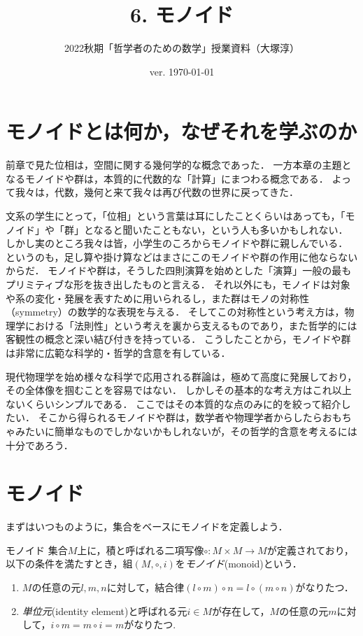 \documentclass[11pt,a4paper, dvipdfmx]{jsarticle}
\begin{document}
\title{6. モノイド}
\author{2022秋期「哲学者のための数学」授業資料（大塚淳）}
\date{ver. \today}
\maketitle

\section{モノイドとは何か，なぜそれを学ぶのか}
前章で見た位相は，空間に関する幾何学的な概念であった．
一方本章の主題となるモノイドや群は，本質的に代数的な「計算」にまつわる概念である．
よって我々は，代数，幾何と来て我々は再び代数の世界に戻ってきた．

文系の学生にとって，「位相」という言葉は耳にしたことくらいはあっても，「モノイド」や「群」となると聞いたこともない，という人も多いかもしれない．
しかし実のところ我々は皆，小学生のころからモノイドや群に親しんでいる．
というのも，足し算や掛け算などはまさにこのモノイドや群の作用に他ならないからだ．
モノイドや群は，そうした四則演算を始めとした「演算」一般の最もプリミティブな形を抜き出したものと言える．
それ以外にも，モノイドは対象や系の変化・発展を表すために用いられるし，また群はモノの対称性（symmetry）の数学的な表現を与える．
そしてこの対称性という考え方は，物理学における「法則性」という考えを裏から支えるものであり，また哲学的には客観性の概念と深い結び付きを持っている．
こうしたことから，モノイドや群は非常に広範な科学的・哲学的含意を有している．

現代物理学を始め様々な科学で応用される群論は，極めて高度に発展しており，その全体像を掴むことを容易ではない．
しかしその基本的な考え方はこれ以上ないくらいシンプルである．
ここではその本質的な点のみに的を絞って紹介したい．
そこから得られるモノイドや群は，数学者や物理学者からしたらおもちゃみたいに簡単なものでしかないかもしれないが，その哲学的含意を考えるには十分であろう．

\section{モノイド}
まずはいつものように，集合をベースにモノイドを定義しよう．

\begin{itembox}[l]{モノイド}
集合$M$上に，積と呼ばれる二項写像$\circ: M \times M \to M$が定義されており，以下の条件を満たすとき，組$(M, \circ, i)$を\emph{モノイド}(monoid)という．
\begin{enumerate}
 \item $M$の任意の元$l, m, n$に対して，結合律$(l \circ m) \circ n = l \circ (m \circ n)$がなりたつ．
 \item \emph{単位元}(identity element)と呼ばれる元$i \in M$が存在して，$M$の任意の元$m$に対して，$i \circ m = m \circ i = m$がなりたつ.
\end{enumerate} 
\end{itembox}
\end{document}
